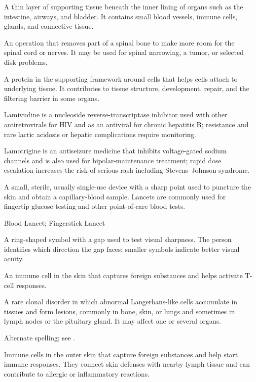  A thin layer of supporting tissue beneath the inner lining of organs such as the intestine, airways, and bladder. It contains small blood vessels, immune cells, glands, and connective tissue.

 An operation that removes part of a spinal bone to make more room for the spinal cord or nerves. It may be used for spinal narrowing, a tumor, or selected disk problems.

 A protein in the supporting framework around cells that helps cells attach to underlying tissue. It contributes to tissue structure, development, repair, and the filtering barrier in some organs.

 Lamivudine is a nucleoside reverse-transcriptase inhibitor used with other antiretrovirals for HIV and as an antiviral for chronic hepatitis B; resistance and rare lactic acidosis or hepatic complications require monitoring.

 Lamotrigine is an antiseizure medicine that inhibits voltage-gated sodium channels and is also used for bipolar-maintenance treatment; rapid dose escalation increases the risk of serious rash including Stevens--Johnson syndrome.

 A small, sterile, usually single-use device with a sharp point used to puncture the skin and obtain a capillary-blood sample. Lancets are commonly used for fingertip glucose testing and other point-of-care blood tests.

\synonyms
Blood Lancet; Fingerstick Lancet

 A ring-shaped symbol with a gap used to test visual sharpness. The person identifies which direction the gap faces; smaller symbols indicate better visual acuity.

 An immune cell in the skin that captures foreign substances and helps activate T-cell responses.

 A rare clonal disorder in which abnormal Langerhans-like cells accumulate in tissues and form lesions, commonly in bone, skin, or lungs and sometimes in lymph nodes or the pituitary gland. It may affect one or several organs.

 Alternate spelling; see .

 Immune cells in the outer skin that capture foreign substances and help start immune responses. They connect skin defenses with nearby lymph tissue and can contribute to allergic or inflammatory reactions.

